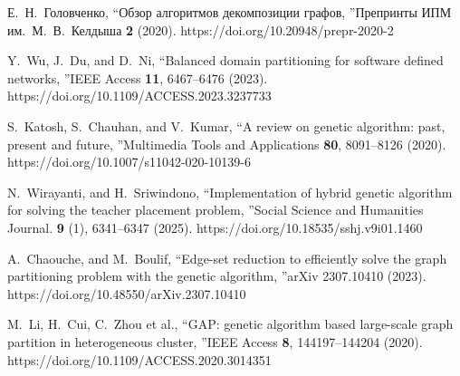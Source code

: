 \documentclass[
11pt,%
tightenlines,%
twoside,%
onecolumn,%
nofloats,%
nobibnotes,%
nofootinbib,%
superscriptaddress,%
noshowpacs,%
centertags]%
{revtex4}
\begin{document}
\begin{thebibliography}{99}
Е.~Н.~Головченко, \textquotedblleft Обзор алгоритмов декомпозиции графов, \textquotedblright Препринты ИПМ им.~М.~В.~Келдыша \textbf{2} (2020). https://doi.org/10.20948/prepr-2020-2

Y.~Wu, J.~Du, and D.~Ni, \textquotedblleft Balanced domain partitioning for software defined networks, \textquotedblright IEEE Access \textbf{11}, 6467--6476 (2023). https://doi.org/10.1109/ACCESS.2023.3237733

S.~Katosh, S.~Chauhan, and V.~Kumar, \textquotedblleft A review on genetic algorithm: past, present and future, \textquotedblright Multimedia Tools and Applications \textbf{80}, 8091--8126 (2020). https://doi.org/10.1007/s11042-020-10139-6

N.~Wirayanti, and H.~Sriwindono, \textquotedblleft Implementation of hybrid genetic algorithm for solving the teacher placement problem, \textquotedblright Social Science and Humanities Journal. \textbf{9} (1), 6341--6347 (2025). https://doi.org/10.18535/sshj.v9i01.1460

A.~Chaouche, and M.~Boulif, \textquotedblleft Edge-set reduction to efficiently solve the graph partitioning problem with the genetic algorithm, \textquotedblright arXiv 2307.10410 (2023). https://doi.org/10.48550/arXiv.2307.10410

M.~Li, H.~Cui, C.~Zhou et al., \textquotedblleft GAP: genetic algorithm based large-scale graph partition in heterogeneous cluster, \textquotedblright IEEE Access \textbf{8}, 144197--144204 (2020). https://doi.org/10.1109/ACCESS.2020.3014351

\end{thebibliography}
\end{document}
